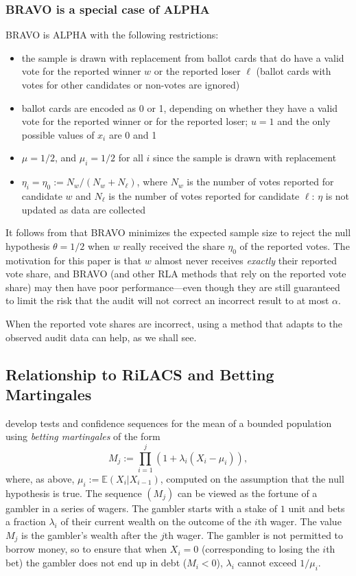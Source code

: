 \documentclass[aoas]{imsart}
\newcommand{\EE}{\mathbb{E}}
\begin{document}
\subsubsection{BRAVO is a special case of ALPHA}
BRAVO is ALPHA with the following restrictions:
\begin{itemize}
    \item the sample is drawn with replacement from ballot cards that do have a valid vote for the reported winner 
    $w$ or the reported loser $\ell$ (ballot cards with votes for other candidates or non-votes are ignored)
    \item  ballot cards are encoded as 0 or 1, depending on whether they have a valid vote
    for the reported winner or for the reported loser;  $u=1$ and the only possible values of $x_i$ are 0 and 1
    \item $\mu = 1/2$, and $\mu_i = 1/2$ for all $i$ since the sample is drawn with replacement
    \item  $\eta_i = \eta_0 := N_w/(N_w+N_\ell)$, where $N_w$ is the number of votes reported for candidate $w$ 
and $N_\ell$ is the number of votes reported for candidate $\ell$: $\eta$ is not updated as data are collected
\end{itemize}
It follows from \citet{wald45} that BRAVO minimizes the expected 
sample size to reject the null hypothesis $\theta=1/2$ when $w$ really received
the share $\eta_0$ of the reported votes.
The motivation for this paper is that $w$ almost never receives \emph{exactly} their reported vote share, and
BRAVO (and other RLA methods that rely on the reported vote share) may then have poor performance---even
though they are still guaranteed to limit the risk that the audit will not correct an incorrect result to at most $\alpha$.

When the reported vote shares are incorrect, using a method that
adapts to the observed audit data can help, as we shall see.

\subsection{Relationship to RiLACS and Betting Martingales} \label{sec:rilacs}
\citet{waudby-smithRamdas21,waudby-smithEtal21} develop tests and
confidence sequences for the mean of a bounded population
using \emph{betting martingales} of the form
\begin{equation} \label{eq:lambda-rilacs}
M_j := \prod_{i=1}^j (1 + \lambda_i (X_i- \mu_i)),
\end{equation}
where, as above, $\mu_i := \EE(X_i | X_{i-1})$, computed on the assumption that the null hypothesis is true.
The sequence $(M_j)$ can be viewed as the fortune of a gambler in a series of wagers.
The gambler starts with a stake of $1$ unit and bets a fraction $\lambda_i$ of their current wealth on the outcome
of the $i$th wager.
The value $M_j$ is the gambler's wealth after the $j$th wager.
The gambler is not permitted to borrow money, so to ensure that when $X_i = 0$ (corresponding to losing the $i$th bet)
the gambler does not end up in debt ($M_i < 0$), $\lambda_i$ cannot exceed $1/\mu_i$.
\end{document}
